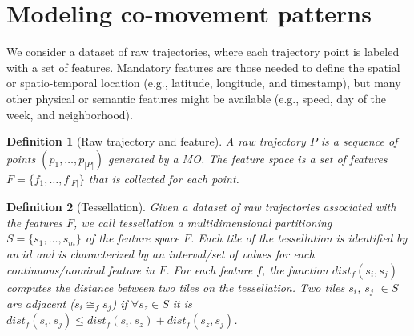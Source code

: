 \documentclass[
]{ceurart}
\newtheorem{definition}{Definition}
\begin{document}
\section{Modeling co-movement patterns}\label{sec:modeling}
We consider a dataset of raw trajectories, where each trajectory point is labeled with a set of features.
Mandatory features are those needed to define the spatial or spatio-temporal location (e.g., latitude, longitude, and timestamp), but many other physical or semantic features might be available (e.g., speed, day of the week, and neighborhood).

\begin{definition}[Raw trajectory and feature] 
A \textit{raw trajectory} $P$ is a sequence of points $(p_1, \ldots, p_{|P|})$ generated by a MO. 
The \textit{feature space} is a set of features $F=\{f_1,\ldots,f_{|F|}\}$ that is collected for each point.
\end{definition}

\begin{definition}[Tessellation] 
Given a dataset of raw trajectories associated with the features $F$, we call \textit{tessellation} a multidimensional partitioning $S = \{s_1, \ldots, s_m\}$ of the feature space $F$.
Each \textit{tile} of the tessellation is identified by an $id$ and is characterized by an interval/set of values for each continuous/nominal feature in $F$.
For each feature $f$, the function $dist_f(s_i, s_j)$ computes the distance between two tiles on the tessellation.
Two tiles $s_i$, $s_j$ $\in S$ are  \textit{adjacent} ($s_i \cong_{f} s_j$) if $\forall s_z \in S$ it is $dist_f(s_i,s_j)\leq dist_f(s_i,s_z) + dist_f(s_z,s_j)$.
\end{definition}
\end{document}

